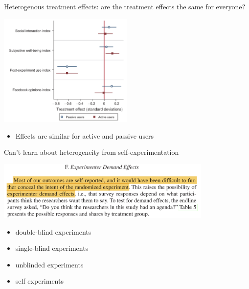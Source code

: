 \documentclass[aspectratio=169]{beamer}
\begin{document}
\begin{frame}

Heterogenous treatment effects: are the treatment effects the same for everyone? \pause

\begin{center}
\includegraphics[width=0.5\textwidth]{figures/allcott_welfare_2020_fig9top}
\end{center}

\begin{itemize}
\item Effects are similar for active and passive users
\end{itemize}

\vfill 
Can't learn about heterogeneity from self-experimentation

\end{frame}
\begin{frame}

\begin{center}
\includegraphics[width=0.8\textwidth]{figures/allcott_welfare_2020_demandeffects}
\end{center}

\pause
\begin{itemize}
\item double-blind experiments \pause
\item single-blind experiments \pause
\item unblinded experiments \pause
\item self experiments
\end{itemize}

\end{frame}
\end{document}
